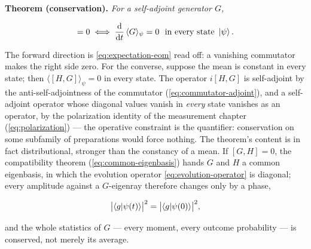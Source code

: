 \textbf{Theorem (conservation).} \emph{For a self-adjoint generator $G$,}
\begin{linenomath}
    \begin{equation}
        [G,H] = 0
        \;\Longleftrightarrow\;
        \frac{\dd}{\dd t}\,\langle G\rangle_\psi = 0 \ \ \text{in every state } \ket{\psi} .
        \label{eq:conservation-theorem}
    \end{equation}
\end{linenomath}
The forward direction is \eqref{eq:expectation-eom} read off: a vanishing commutator makes the right side zero. For the converse, suppose the mean is constant in every state; then $\langle[H,G]\rangle_\psi = 0$ in every state. The operator $i[H,G]$ is self-adjoint by the anti-self-adjointness of the commutator (\eqref{eq:commutator-adjoint}), and a self-adjoint operator whose diagonal values vanish in \emph{every} state vanishes as an operator, by the polarization identity of the measurement chapter (\eqref{eq:polarization}) --- the operative constraint is the quantifier: conservation on some subfamily of preparations would force nothing. The theorem's content is in fact distributional, stronger than the constancy of a mean. If $[G,H] = 0$, the compatibility theorem (\eqref{eq:common-eigenbasis}) hands $G$ and $H$ a common eigenbasis, in which the evolution operator \eqref{eq:evolution-operator} is diagonal; every amplitude against a $G$-eigenray therefore changes only by a phase,
\begin{linenomath}
    \begin{equation}
        \bigl|\braket{g|\psi(t)}\bigr|^2 = \bigl|\braket{g|\psi(0)}\bigr|^2 ,
        \label{eq:conservation-distributional}
    \end{equation}
\end{linenomath}
and the whole statistics of $G$ --- every moment, every outcome probability --- is conserved, not merely its average.

